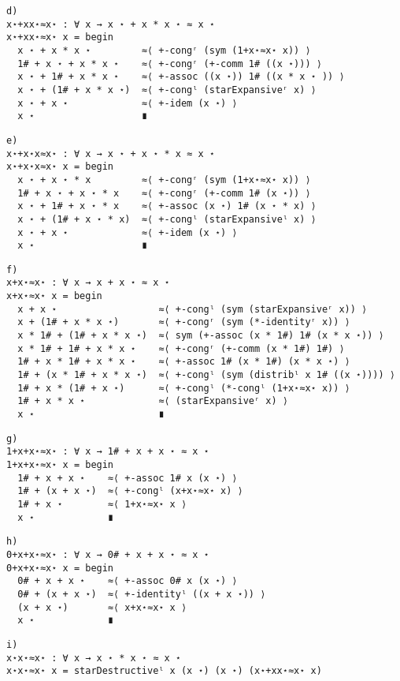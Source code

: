 \begin{Verbatim}
d)
x⋆+xx⋆≈x⋆ : ∀ x → x ⋆ + x * x ⋆ ≈ x ⋆
x⋆+xx⋆≈x⋆ x = begin
  x ⋆ + x * x ⋆         ≈⟨ +-congʳ (sym (1+x⋆≈x⋆ x)) ⟩
  1# + x ⋆ + x * x ⋆    ≈⟨ +-congʳ (+-comm 1# ((x ⋆))) ⟩
  x ⋆ + 1# + x * x ⋆    ≈⟨ +-assoc ((x ⋆)) 1# ((x * x ⋆ )) ⟩
  x ⋆ + (1# + x * x ⋆)  ≈⟨ +-congˡ (starExpansiveʳ x) ⟩
  x ⋆ + x ⋆             ≈⟨ +-idem (x ⋆) ⟩
  x ⋆                   ∎
\end{Verbatim}

\begin{Verbatim}
e)
x⋆+x⋆x≈x⋆ : ∀ x → x ⋆ + x ⋆ * x ≈ x ⋆
x⋆+x⋆x≈x⋆ x = begin
  x ⋆ + x ⋆ * x         ≈⟨ +-congʳ (sym (1+x⋆≈x⋆ x)) ⟩
  1# + x ⋆ + x ⋆ * x    ≈⟨ +-congʳ (+-comm 1# (x ⋆)) ⟩
  x ⋆ + 1# + x ⋆ * x    ≈⟨ +-assoc (x ⋆) 1# (x ⋆ * x) ⟩
  x ⋆ + (1# + x ⋆ * x)  ≈⟨ +-congˡ (starExpansiveˡ x) ⟩
  x ⋆ + x ⋆             ≈⟨ +-idem (x ⋆) ⟩
  x ⋆                   ∎
\end{Verbatim}

\begin{Verbatim}
f)
x+x⋆≈x⋆ : ∀ x → x + x ⋆ ≈ x ⋆
x+x⋆≈x⋆ x = begin
  x + x ⋆                  ≈⟨ +-congˡ (sym (starExpansiveʳ x)) ⟩
  x + (1# + x * x ⋆)       ≈⟨ +-congʳ (sym (*-identityʳ x)) ⟩
  x * 1# + (1# + x * x ⋆)  ≈⟨ sym (+-assoc (x * 1#) 1# (x * x ⋆)) ⟩
  x * 1# + 1# + x * x ⋆    ≈⟨ +-congʳ (+-comm (x * 1#) 1#) ⟩
  1# + x * 1# + x * x ⋆    ≈⟨ +-assoc 1# (x * 1#) (x * x ⋆) ⟩
  1# + (x * 1# + x * x ⋆)  ≈⟨ +-congˡ (sym (distribˡ x 1# ((x ⋆)))) ⟩
  1# + x * (1# + x ⋆)      ≈⟨ +-congˡ (*-congˡ (1+x⋆≈x⋆ x)) ⟩
  1# + x * x ⋆             ≈⟨ (starExpansiveʳ x) ⟩
  x ⋆                      ∎
\end{Verbatim}

\begin{Verbatim}
g)
1+x+x⋆≈x⋆ : ∀ x → 1# + x + x ⋆ ≈ x ⋆
1+x+x⋆≈x⋆ x = begin
  1# + x + x ⋆    ≈⟨ +-assoc 1# x (x ⋆) ⟩
  1# + (x + x ⋆)  ≈⟨ +-congˡ (x+x⋆≈x⋆ x) ⟩
  1# + x ⋆        ≈⟨ 1+x⋆≈x⋆ x ⟩
  x ⋆             ∎
\end{Verbatim}

\begin{Verbatim}
h)
0+x+x⋆≈x⋆ : ∀ x → 0# + x + x ⋆ ≈ x ⋆
0+x+x⋆≈x⋆ x = begin
  0# + x + x ⋆    ≈⟨ +-assoc 0# x (x ⋆) ⟩
  0# + (x + x ⋆)  ≈⟨ +-identityˡ ((x + x ⋆)) ⟩
  (x + x ⋆)       ≈⟨ x+x⋆≈x⋆ x ⟩
  x ⋆             ∎
\end{Verbatim}

\begin{Verbatim}
i)
x⋆x⋆≈x⋆ : ∀ x → x ⋆ * x ⋆ ≈ x ⋆
x⋆x⋆≈x⋆ x = starDestructiveˡ x (x ⋆) (x ⋆) (x⋆+xx⋆≈x⋆ x)
\end{Verbatim}

